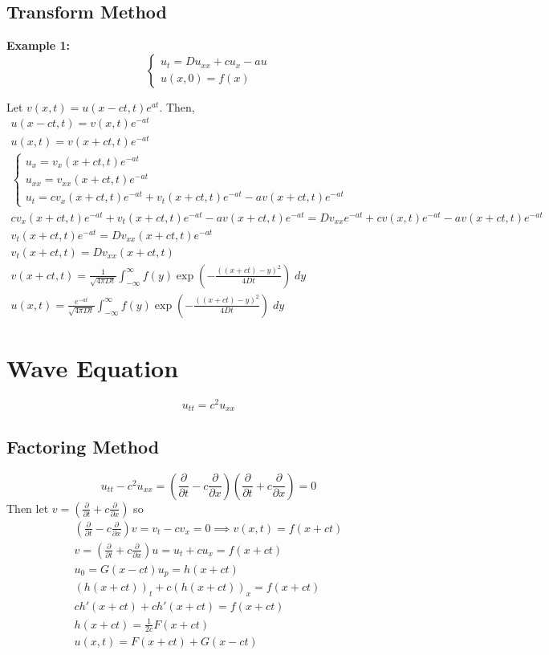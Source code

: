\documentclass[10pt]{article}
\begin{document}
\subsection{Transform Method}
\textbf{Example 1:} 
\[\begin{cases}
    u_t = Du_{xx} + cu_x - au\\
    u(x, 0) = f(x)
\end{cases}\]

Let $v(x, t)= u(x- ct, t)e^{at}$. Then, 
\begin{gather*}
    u(x - ct, t) = v(x, t)e^{-at}\\
    u(x, t) = v(x + ct, t)e^{-at}\\
    \begin{cases}
        u_x = v_x(x+ct, t)e^{-at}\\
        u_{xx} = v_{xx}(x+ct, t)e^{-at}\\
        u_t = cv_x(x + ct, t)e^{-at} + v_t(x+ct, t)e^{-at} -av(x + ct, t)e^{-at}
    \end{cases}\\
    cv_x(x + ct, t)e^{-at} + v_t(x+ct, t)e^{-at} -av(x + ct, t)e^{-at} = D v_{xx}e^{-at} + cv(x, t)e^{-at} -av(x + ct, t)e^{-at}\\
    v_t(x+ct, t)e^{-at} = D v_{xx}(x+ct, t)e^{-at} \\
    v_t(x + ct, t) = Dv_{xx}(x + ct, t)\\
    v(x + ct, t) = \frac{1}{\sqrt{4\pi Dt}} \int_{-\infty}^{\infty} f(y) \exp(-\frac{((x + ct) - y)^2}{4Dt})\; dy\\
    u(x, t) = \frac{e^{-at}}{\sqrt{4\pi Dt}} \int_{-\infty}^{\infty} f(y) \exp(-\frac{((x + ct) - y)^2}{4Dt})\; dy
\end{gather*}

\section{Wave Equation}
\[u_{tt} = c^2 u_{xx}\]
\subsection{Factoring Method}
\[u_{tt} - c^2u_{xx} = \left(\frac{\partial}{\partial t} - c\frac{\partial}{\partial x}\right)\left(\frac{\partial}{\partial t} + c\frac{\partial}{\partial x}\right) =0\] 
Then let $v = \left(\frac{\partial}{\partial t} + c\frac{\partial}{\partial x}\right)$ so 
\begin{gather*}
    \left(\frac{\partial}{\partial t} - c\frac{\partial}{\partial x}\right)v = v_t - cv_x = 0 \implies v(x, t) = f(x + ct)\\
    v = \left(\frac{\partial}{\partial t} + c\frac{\partial}{\partial x}\right)u = u_t + cu_x = f(x + ct)\\
    u_0 = G(x - ct)
    u_p = h(x + ct)\\
    (h(x + ct))_t + c(h(x + ct))_x = f(x+ct)\\
    ch'(x + ct) + ch'(x + ct) = f(x + ct)\\
    h(x + ct) = \frac{1}{2c}F(x + ct)\\
    u(x, t) = F(x + ct) + G(x - ct)
\end{gather*}
\end{document}
